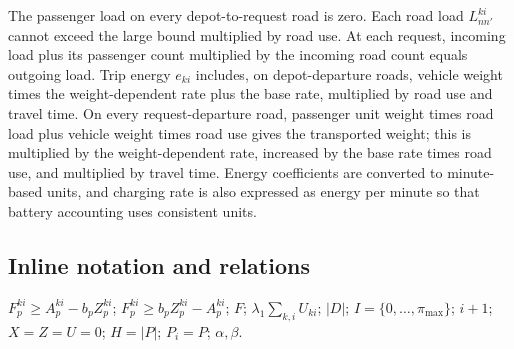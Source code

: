 \documentclass[10pt]{article}
\begin{document}
The passenger load on every depot-to-request road is zero. Each road load $L_{nn'}^{ki}$ cannot exceed the large bound multiplied by road use. At each request, incoming load plus its passenger count multiplied by the incoming road count equals outgoing load. Trip energy $e_{ki}$ includes, on depot-departure roads, vehicle weight times the weight-dependent rate plus the base rate, multiplied by road use and travel time. On every request-departure road, passenger unit weight times road load plus vehicle weight times road use gives the transported weight; this is multiplied by the weight-dependent rate, increased by the base rate times road use, and multiplied by travel time. Energy coefficients are converted to minute-based units, and charging rate is also expressed as energy per minute so that battery accounting uses consistent units.

\subsection*{Inline notation and relations}
$F_p^{ki}\ge A_p^{ki}-b_pZ_p^{ki}$; $F_p^{ki}\ge b_pZ_p^{ki}-A_p^{ki}$; $F$; $\lambda_1\sum_{k,i}U_{ki}$; $|D|$; $I=\{0,\ldots,\pi_{\max}\}$; $i+1$; $X=Z=U=0$; $H=|P|$; $P_i=P$; $\alpha,\beta$.
\end{document}
